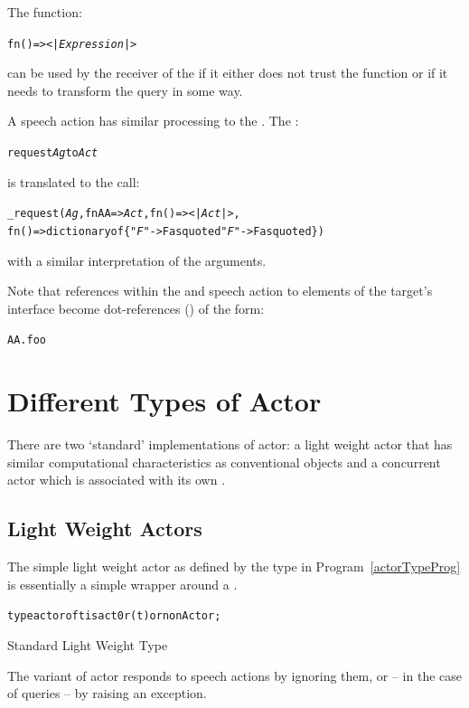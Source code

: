 The function:
\begin{alltt}
fn ()=><|\emph{Expression}|>
\end{alltt}
can be used by the receiver of the  if it either does not trust the function or if it needs to transform the query in some way. 

A  speech action has similar processing to the . The :

\begin{alltt}
request \emph{Ag} to \emph{Act}
\end{alltt}
is translated to the call:
\begin{alltt}
_request(\emph{Ag},fn AA=>\emph{Act},fn ()=><|\emph{Act}|>,
      fn ()=>dictionary of \{"\emph{F}"->F as quoted\sequence{;}"\emph{F\subn}"->F\subn as quoted\})
\end{alltt}
with a similar interpretation of the arguments.

Note that references within the  and  speech action to elements of the target's interface become dot-references () of the form:
\begin{alltt}
AA.foo
\end{alltt}

\section{Different Types of Actor}
\label{actorTypes}
There are two `standard' implementations of actor: a light weight actor that has similar computational characteristics as conventional objects and a concurrent actor which is associated with its own .

\subsection{Light Weight Actors}
\label{liteActor}

The simple light weight actor as defined by the  type in Program~\vref{actorTypeProg} is essentially a simple wrapper around a . 

\begin{program}
\begin{alltt}
type actor of t is act0r(t) or nonActor;
\end{alltt}
\caption{Standard Light Weight  Type}
\label{actorTypeProg}
\end{program}

The  variant of actor responds to speech actions by ignoring them, or -- in the case of queries -- by raising an exception.


